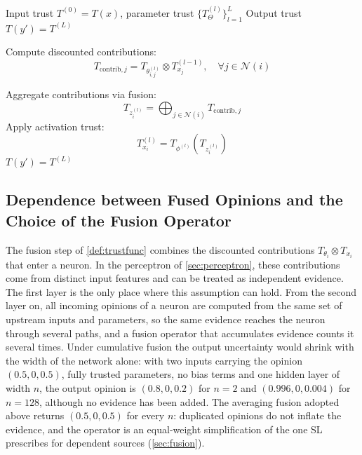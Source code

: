 
\begin{algorithm}
\caption{Trust Feedforward}
\begin{algorithmic}[1]
\Require Input trust $T^{(0)} = T(x)$, parameter trust 
         $\{T^{(l)}_\Theta\}_{l=1}^{L}$
\Ensure Output trust $T(y') = T^{(L)}$

        \State Compute discounted contributions:
        \[
        T_{\text{contrib},j} = T_{\theta^{(l)}_{i,j}} \otimes T^{(l-1)}_{x_j}, 
        \quad \forall j \in \mathcal{N}(i)
        \]
        
        \State Aggregate contributions via fusion:
        \[
        T_{z^{(l)}_i} = \bigoplus_{j \in \mathcal{N}(i)} T_{\text{contrib},j}
        \]
        \State Apply activation trust:
        \[
        T^{(l)}_{x_i} = T_{\phi^{(l)}}(T_{z^{(l)}_i})
        \]
    \EndFor
\EndFor
\State \Return $T(y') = T^{(L)}$
\end{algorithmic}
\label{alg:trustff}
\end{algorithm}

\subsection{Dependence between Fused Opinions and the Choice of the Fusion Operator}
\label{sec:fusion_choice}
The fusion step of \cref{def:trustfunc} combines the discounted contributions $T_{\theta_i} \otimes T_{x_i}$ that enter a neuron. In the perceptron of \cref{sec:perceptron}, these contributions come from distinct input features and can be treated as independent evidence. The first layer is the only place where this assumption can hold. From the second layer on, all incoming opinions of a neuron are computed from the same set of upstream inputs and parameters, so the same evidence reaches the neuron through several paths, and a fusion operator that accumulates evidence counts it several times. Under cumulative fusion the output uncertainty would shrink with the width of the network alone: with two inputs carrying the opinion $(0.5, 0, 0.5)$, fully trusted parameters, no bias terms and one hidden layer of width $n$, the output opinion is $(0.8, 0, 0.2)$ for $n = 2$ and $(0.996, 0, 0.004)$ for $n = 128$, although no evidence has been added. The averaging fusion adopted above returns $(0.5, 0, 0.5)$ for every $n$: duplicated opinions do not inflate the evidence, and the operator is an equal-weight simplification of the one \ac{SL} prescribes for dependent sources (\cref{sec:fusion}).

